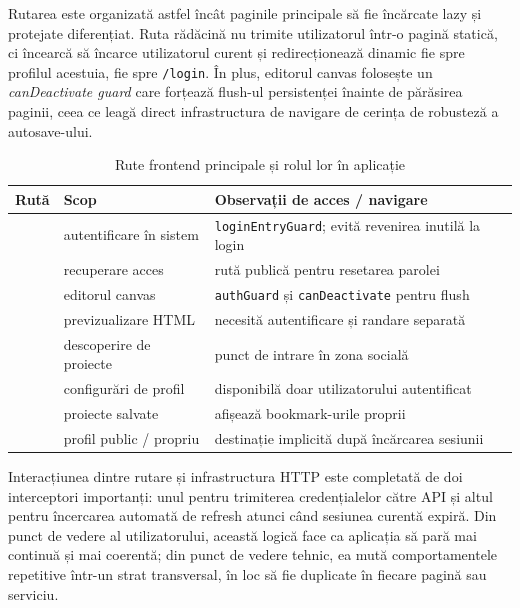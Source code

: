 Rutarea este organizată astfel încât paginile principale să fie încărcate lazy și protejate diferențiat. Ruta rădăcină nu trimite utilizatorul într-o pagină statică, ci încearcă să încarce utilizatorul curent și redirecționează dinamic fie spre profilul acestuia, fie spre \texttt{/login}. În plus, editorul canvas folosește un \textit{canDeactivate guard} care forțează flush-ul persistenței înainte de părăsirea paginii, ceea ce leagă direct infrastructura de navigare de cerința de robusteză a autosave-ului.

\begin{table}[H]
  \centering
  \caption{Rute frontend principale și rolul lor în aplicație}
  \label{tab:rute-frontend}
  \renewcommand{\arraystretch}{1.15}
  \begin{tabularx}{\textwidth}{>{\RaggedRight\arraybackslash}p{4.2cm}>{\RaggedRight\arraybackslash}p{4.1cm}Y}
    \toprule
    \textbf{Rută} & \textbf{Scop} & \textbf{Observații de acces / navigare} \\
    \midrule
     & autentificare în sistem & \texttt{loginEntryGuard}; evită revenirea inutilă la login \\
     & recuperare acces & rută publică pentru resetarea parolei \\
     & editorul canvas & \texttt{authGuard} și \texttt{canDeactivate} pentru flush \\
     & previzualizare HTML & necesită autentificare și randare separată \\
     & descoperire de proiecte & punct de intrare în zona socială \\
     & configurări de profil & disponibilă doar utilizatorului autentificat \\
     & proiecte salvate & afișează bookmark-urile proprii \\
     & profil public / propriu & destinație implicită după încărcarea sesiunii \\
    \bottomrule
  \end{tabularx}
\end{table}

Interacțiunea dintre rutare și infrastructura HTTP este completată de doi interceptori importanți: unul pentru trimiterea credențialelor către API și altul pentru încercarea automată de refresh atunci când sesiunea curentă expiră. Din punct de vedere al utilizatorului, această logică face ca aplicația să pară mai continuă și mai coerentă; din punct de vedere tehnic, ea mută comportamentele repetitive într-un strat transversal, în loc să fie duplicate în fiecare pagină sau serviciu.


